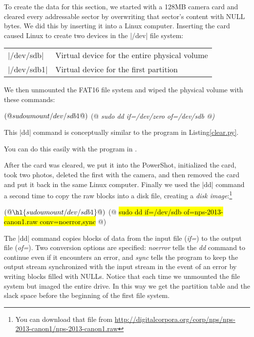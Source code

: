 To create the data for this section, we started with a 128MB camera
card and cleared every addressable sector by overwriting that sector's
content with NULL bytes. We did this by inserting it into a Linux
computer. Inserting the card caused Linux to create two devices in the
|/dev| file system:

\begin{tabular}{ll}
|/dev/sdb| & Virtual device for the entire physical volume \\
|/dev/sdb1| & Virtual device for the first partition \\
\end{tabular}


We then unmounted the FAT16 file system and wiped the physical volume
with these commands:

\begin{code}
$ (@ \sl{sudo umount /dev/sdb1} @) 
$ (@ \sl{sudo dd if=/dev/zero of=/dev/sdb} @)
\end{code}

This |dd| command is conceptually similar to the program in Listing\ref{clear.py}.

You can do this
easily with the program in .

\label{clear.py}

After the card was cleared, we put it into the PowerShot, initialized
the card, took two photos, deleted the first with the camera, and then
removed the card and put it back in the same Linux computer. Finally
we used the |dd| command a second time to copy the raw blocks into a
disk file, creating a \emph{disk image}:\footnote{You can download that file
from \url{http://digitalcorpora.org/corp/nps/nps-2013-canon1/nps-2013-canon1.raw}}

\begin{code}
$ (@ \hl{sudo umount /dev/sdb1} @)
$ (@ \hl{sudo dd if=/dev/sdb of=nps-2013-canon1.raw conv=noerror,sync} @)
\end{code} 

The |dd| command copies blocks of data from the input file (\emph{if=})
to the output file (\emph{of=}). Two conversion options are
specified: \emph{noerror} tells the \emph{dd} command to continue even
if it encounters an error, and \emph{sync} tells the program to keep
the output stream synchronized with the input stream in the event of
an error by writing blocks filled with NULLs.  Notice that each time we unmounted the file system but imaged the
entire drive. In this way we get the partition table and the slack
space before the beginning of the first file system.  



